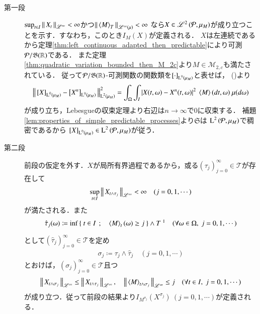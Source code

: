 	\begin{prf}\mbox{}
		\begin{description}
			\item[第一段] $\operatorname*{sup}_{t \in I} \left\|\, X_t\, \right\|_{\mathscr{L}^\infty} < \infty$かつ$\Norm{\inprod<M>_T}{\semiLp{\infty}{\mu}} < \infty$
				なら$X \in \mathscr{L}^{2} \left(\mathcal{P},\mu_M\right)$が成り立つことを示す．すなわち，このとき$I_M(X)$が定義される．
				$X$は左連続であるから定理\ref{thm:left_continuous_adapted_then_predictable}により可測$\mathcal{P}/\mathfrak{B}(\mathbb{R})$である．
				また定理\ref{thm:quadratic_variation_bounded_then_M_2c}より$M \in \mathcal{M}_{2,c}$も満たされている．
				従って$\mathcal{P}/\mathfrak{B}(\mathbb{R})$-可測関数の関数類を$\left[\cdot\right]_{\operatorname{L}^{0} \left(\mu_M\right)}$と表せば，
				()より
				\begin{align}
					\Norm{\equiv{X}{\Lp{0}{\mu_M}} - \equiv{X^n}{\Lp{0}{\mu_M}}}{\Lp{2}{\mu_M}}^2
					= \int_\Omega \int_I \left| X(t,\omega) - X^n(t,\omega) \right|^2\ \inprod<M>(dt,\omega)\ \mu(d\omega)
				\end{align}
				が成り立ち，Lebesgueの収束定理より右辺は$n \longrightarrow \infty$で0に収束する．
				補題\ref{lem:properties_of_simple_predictable_processes}より$\mathfrak{S}$は
				$\operatorname{L}^{2} \left(\mathcal{P},\mu_M\right)$で稠密であるから
				$\left[X\right]_{\operatorname{L}^{0} \left(\mu_M\right)} \in \operatorname{L}^{2} \left(\mathcal{P},\mu_M\right)$が従う．
				
			\item[第二段]
				前段の仮定を外す．$X$が局所有界過程であるから，或る$(\tau_j)_{j=0}^{\infty} \in \mathcal{T}$が存在して
				\begin{align}
					\operatorname*{sup}_{t \in I} \left\|\, X_{t \wedge \tau_j}\, \right\|_{\mathscr{L}^\infty} < \infty
					\quad (j=0,1,\cdots)
				\end{align}
				が満たされる．また
				\begin{align}
					\hat{\tau}_j(\omega) \coloneqq
					\inf{}{\Set{t \in I}{\inprod<M>_t(\omega) \geq j}} \wedge T\ \footnotemark
					\quad (\forall \omega \in \Omega,\ j=0,1,\cdots)
				\end{align}
				として$\left( \hat{\tau}_j \right)_{j=0}^{\infty} \in \mathcal{T}$を定め
				\begin{align}
					\sigma_j \coloneqq \tau_j \wedge \hat{\tau}_j
					\quad (j=0,1,\cdots)
				\end{align}
				とおけば，$(\sigma_j)_{j=0}^{\infty} \in \mathcal{T}$且つ
				\begin{align}
					\Norm{X_{t \wedge \sigma_j}}{\mathscr{L}^\infty} \leq \Norm{X_{t \wedge \tau_j}}{\mathscr{L}^\infty},
					\quad \Norm{\inprod<M>_{t \wedge \sigma_j}}{\mathscr{L}^\infty} \leq j
					\quad (\forall t \in I,\ j=0,1,\cdots)
				\end{align}
				が成り立つ．従って前段の結果より$I_{M^{\sigma_j}}(X^{\sigma_j})\ (j=0,1,\cdots)$が定義される．
				

\end{description}
\end{prf}
